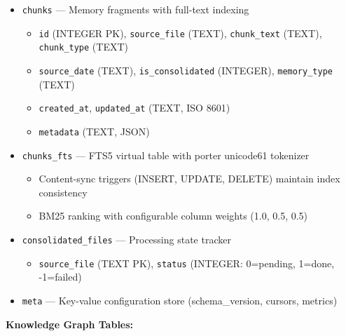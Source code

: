 \documentclass[
]{article}
\providecommand{\tightlist}{%
  \setlength{\itemsep}{0pt}\setlength{\parskip}{0pt}}
\begin{document}
\begin{itemize}
\tightlist
\item
  \texttt{chunks} --- Memory fragments with full-text indexing

  \begin{itemize}
  \tightlist
  \item
    \texttt{id} (INTEGER PK), \texttt{source\_file} (TEXT),
    \texttt{chunk\_text} (TEXT), \texttt{chunk\_type} (TEXT)
  \item
    \texttt{source\_date} (TEXT), \texttt{is\_consolidated} (INTEGER),
    \texttt{memory\_type} (TEXT)
  \item
    \texttt{created\_at}, \texttt{updated\_at} (TEXT, ISO 8601)
  \item
    \texttt{metadata} (TEXT, JSON)
  \end{itemize}
\item
  \texttt{chunks\_fts} --- FTS5 virtual table with porter unicode61
  tokenizer

  \begin{itemize}
  \tightlist
  \item
    Content-sync triggers (INSERT, UPDATE, DELETE) maintain index
    consistency
  \item
    BM25 ranking with configurable column weights (1.0, 0.5, 0.5)
  \end{itemize}
\item
  \texttt{consolidated\_files} --- Processing state tracker

  \begin{itemize}
  \tightlist
  \item
    \texttt{source\_file} (TEXT PK), \texttt{status} (INTEGER:
    0=pending, 1=done, -1=failed)
  \end{itemize}
\item
  \texttt{meta} --- Key-value configuration store (schema\_version,
  cursors, metrics)
\end{itemize}

\textbf{Knowledge Graph Tables:}
\end{document}
